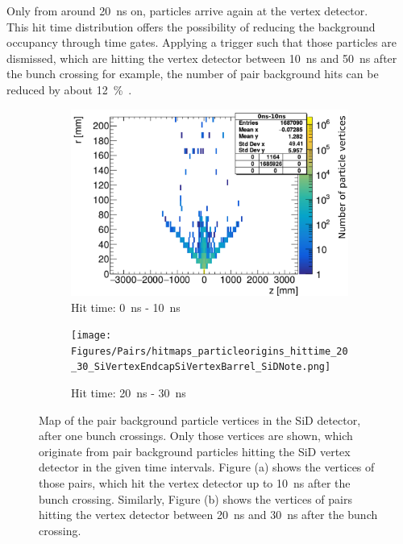 Only from around \SI{20}{\nano\second} on, particles arrive again at the vertex detector.
\\This hit time distribution offers the possibility of reducing the background occupancy through time gates.
Applying a trigger such that those particles are dismissed, which are hitting the vertex detector between \SI{10}{\nano\second} and \SI{50}{\nano\second} after the bunch crossing for example, the number of pair background hits can be reduced by about \SI{12}{\percent}~\cite[p. 27]{SiDBkgNote}.
 \begin{figure}[h]
 \centering
  \begin{subfigure}[b]{0.49\textwidth}
   \centering
    \includegraphics[width=\textwidth]{Figures/Pairs/hitmaps_particleorigins_hittime_0_10_SiVertexEndcapSiVertexBarrel_SiDNote.png}
   \caption{Hit time: \SI[detect-all]{0}{\nano\second} - \SI[detect-all]{10}{\nano\second}}
   \end{subfigure}
   \hfill
    \begin{subfigure}[b]{0.49\textwidth}
   \centering
    \texttt{[image: Figures/Pairs/hitmaps\_particleorigins\_hittime\_20\_30\_SiVertexEndcapSiVertexBarrel\_SiDNote.png]}
   \caption{Hit time: \SI[detect-all]{20}{\nano\second} - \SI[detect-all]{30}{\nano\second}}
   \end{subfigure}
   \caption[Pair background vertex maps in the SiD detector]{Map of the pair background particle vertices in the SiD detector, after one bunch crossings.
   Only those vertices are shown, which originate from pair background particles hitting the SiD vertex detector in the given time intervals.
   Figure (a) shows the vertices of those pairs, which hit the vertex detector up to \SI[detect-all]{10}{\nano\second} after the bunch crossing.
   Similarly, Figure (b) shows the vertices of pairs hitting the vertex detector between \SI[detect-all]{20}{\nano\second} and \SI[detect-all]{30}{\nano\second} after the bunch crossing.
   }
   \label{fig:PairBkg:Origins_Map}
 \end{figure}
 
